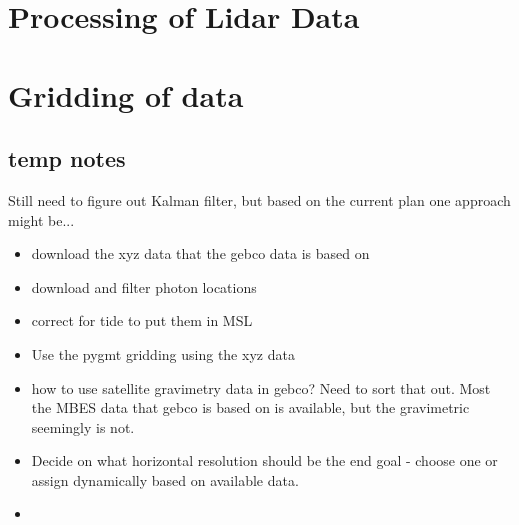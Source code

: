 \section{Processing of Lidar Data}

\section{Gridding of data}
\subsection{temp notes}
Still need to figure out Kalman filter, but based on the current plan one approach might be...
\begin{itemize}
    \color{orange}
    \item download the xyz data that the gebco data is based on
    \item download and filter photon locations
    \item correct for tide to put them in MSL
    \item Use the pygmt gridding using the xyz data
    \item how to use satellite gravimetry data in gebco? Need to sort that out. Most the MBES data that gebco is based on is available, but the gravimetric seemingly is not.
    \item Decide on what horizontal resolution should be the end goal - choose one or assign dynamically based on available data. 
    \item 
\end{itemize}